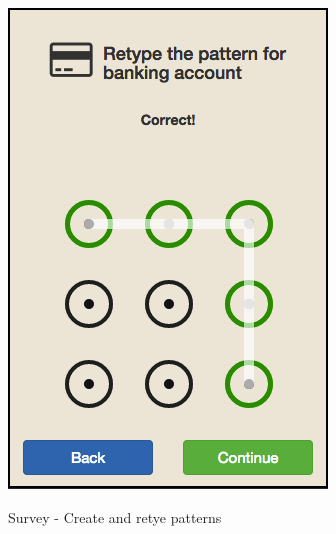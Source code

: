 \begin{figure}[H]
{        \includegraphics[scale=0.3]{pics/survey/retype-correct-bank}
      }
      \caption{Survey - Create and retye patterns}
    \end{figure}

